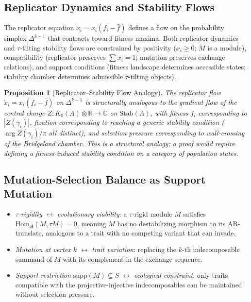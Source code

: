 \documentclass[11pt]{amsart}
\newtheorem{proposition}[theorem]{Proposition}
\begin{document}
\subsection{Replicator Dynamics and Stability Flows}
\label{sec:replicator}

The replicator equation $\dot{x}_i = x_i(f_i - \bar{f})$ defines
a flow on the probability simplex $\Delta^{k-1}$ that contracts
toward fitness maxima.
Both replicator dynamics and $\tau$-tilting stability flows are
constrained by positivity ($x_i \geq 0$; $M$ is a module),
compatibility (replicator preserves $\sum x_i = 1$; mutation
preserves exchange relations), and support conditions (fitness
landscape determines accessible states; stability chamber determines
admissible $\tau$-tilting objects).

\begin{proposition}[Replicator--Stability Flow Analogy]
\label{prop:replicator}
The replicator flow $\dot{x}_i = x_i(f_i - \bar{f})$ on
$\Delta^{k-1}$ is structurally analogous to the gradient flow of the
central charge $Z: K_0(A) \otimes \mathbb{R} \to \mathbb{C}$ on
$\mathrm{Stab}(A)$, with fitness $f_i$ corresponding to $|Z(\gamma_i)|$,
fixation corresponding to reaching a generic stability condition
($\arg Z(\gamma_i)/\pi$ all distinct), and selection pressure
corresponding to wall-crossing of the Bridgeland chamber.
This is a structural analogy; a proof would require defining a
fitness-induced stability condition on a category of population states.
\end{proposition}

\subsection{Mutation-Selection Balance as Support Mutation}
\label{sec:mutation_selection}

\begin{itemize}
\item \emph{$\tau$-rigidity} $\leftrightarrow$ \emph{evolutionary
  viability}: a $\tau$-rigid module $M$ satisfies
  $\mathrm{Hom}_A(M, \tau M) = 0$, meaning $M$ has no destabilizing
  morphism to its AR-translate, analogous to a trait with no competing
  variant that can invade.
\item \emph{Mutation at vertex $k$} $\leftrightarrow$ \emph{trait
  variation}: replacing the $k$-th indecomposable summand of $M$
  with its complement in the exchange sequence.
\item \emph{Support restriction} $\mathrm{supp}(M) \subseteq S$
  $\leftrightarrow$ \emph{ecological constraint}: only traits compatible
  with the projective-injective indecomposables can be maintained
  without selection pressure.
\end{itemize}
\end{document}
